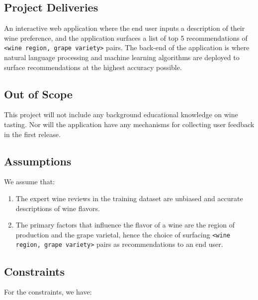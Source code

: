 \documentclass[
]{kaohandt}
\begin{document}
\subsection*{Project Deliveries}

An interactive web application where the end user inputs a description of their wine preference, and the application surfaces a list of top 5 recommendations of \texttt{<wine region, grape variety>} pairs. The back-end of the application is where natural language processing and machine learning algorithms are deployed to surface recommendations at the highest accuracy possible.

\subsection*{Out of Scope}

This project will not include any background educational knowledge on wine tasting. Nor will the application have any mechanisms for collecting user feedback in the first release.

\subsection*{Assumptions}

We assume that:

\begin{enumerate}
	\item The expert wine reviews in the training dataset are unbiased and accurate descriptions of wine flavors.
	\item The primary factors that influence the flavor of a wine are the region of production and the grape varietal, hence the choice of surfacing \texttt{<wine region, grape variety>} pairs as recommendations to an end user.
\end{enumerate}

\subsection*{Constraints}

For the constraints, we have:
\end{document}
